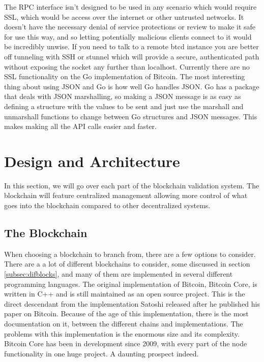 \documentclass[12pt]{article}
\begin{document}
The RPC interface isn't designed to be used in any scenario which would require SSL, which would be access over the internet or other untrusted networks. It doesn't have the necessary denial of service protections or review to make it safe for use this way, and so letting potentially malicious clients connect to it would be incredibly unwise. If you need to talk to a remote btcd instance you are better off tunneling with SSH or stunnel which will provide a secure, authenticated path without exposing the socket any further than localhost. Currently there are no SSL functionality on the Go implementation of Bitcoin. The most interesting thing about using JSON and Go is how well Go handles JSON. Go has a package that deals with JSON marshalling, so making a JSON message is as easy as defining a structure with the values to be sent and just use the marshall and unmarshall functions to change between Go structures and JSON messages. This makes making all the API calls easier and faster.

\section{Design and Architecture}

In this section, we will go over each part of the blockchain validation system. The blockchain will feature centralized management allowing more control of what goes into the blockchain compared to other decentralized systems.

\subsection{The Blockchain}

When choosing a blockchain to branch from, there are a few options to consider. There are a a lot of different blockchains to consider, some discussed in section \ref{subsec:difblocks}, and many of them are implemented in several different programming languages. The original implementation of Bitcoin, Bitcoin Core, is written in C++ and is still maintained as an open source project. This is the direct descendant from the implementation Satoshi released after he published his paper on Bitcoin. Because of the age of this implementation, there is the most documentation on it, between the different chains and implementations. The problems with this implementation is the enormous size and its complexity. Bitcoin Core has been in development since 2009, with every part of the node functionality in one huge project. A daunting prospect indeed.
\end{document}
